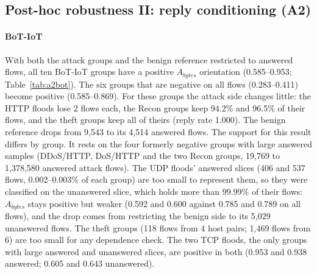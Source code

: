 \documentclass[preprint,12pt]{elsarticle}
\begin{document}
\subsection{Post-hoc robustness II: reply conditioning (A2)}\label{sec:a2}

\paragraph{BoT-IoT} With both the attack groups and the benign reference restricted to answered flows, all ten BoT-IoT groups have a positive $A_{bytes}$ orientation (0.585--0.953; Table~\ref{tab:a2bot}). The six groups that are negative on all flows (0.283--0.411) become positive (0.585--0.869). For these groups the attack side changes little: the HTTP floods lose 2 flows each, the Recon groups keep 94.2\% and 96.5\% of their flows, and the theft groups keep all of theirs (reply rate 1.000). The benign reference drops from 9{,}543 to its 4{,}514 answered flows. The support for this result differs by group. It rests on the four formerly negative groups with large answered samples (DDoS/HTTP, DoS/HTTP and the two Recon groups, 19{,}769 to 1{,}378{,}580 answered attack flows). The UDP floods' answered slices (406 and 537 flows, 0.002--0.003\% of each group) are too small to represent them, so they were classified on the unanswered slice, which holds more than 99.99\% of their flows: $A_{bytes}$ stays positive but weaker (0.592 and 0.600 against 0.785 and 0.789 on all flows), and the drop comes from restricting the benign side to its 5{,}029 unanswered flows. The theft groups (118 flows from 4 host pairs; 1{,}469 flows from 6) are too small for any dependence check. The two TCP floods, the only groups with large answered and unanswered slices, are positive in both (0.953 and 0.938 answered; 0.605 and 0.643 unanswered).
\end{document}
